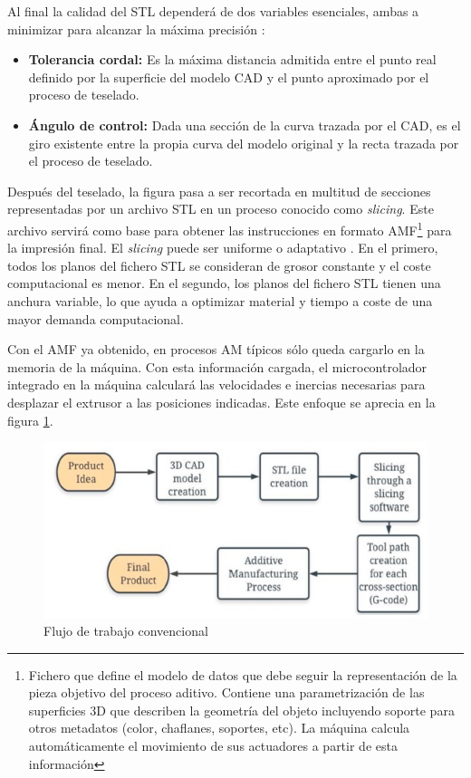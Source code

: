 Al final la calidad del \acrshort{STL} dependerá de dos variables esenciales, ambas a minimizar para alcanzar la máxima precisión \cite{Pinar2019}:
\begin{itemize}
    \item \textbf{Tolerancia cordal:} Es la máxima distancia admitida entre el punto real definido por la superficie del modelo CAD y el punto aproximado por el proceso de teselado.
    \item  \textbf{Ángulo de control:} Dada una sección de la curva trazada por el CAD, es el giro existente entre la propia curva del modelo original y la recta trazada por el proceso de teselado.
\end{itemize}

Después del teselado, la figura pasa a ser recortada en multitud de secciones representadas por un archivo \acrshort{STL} en un proceso conocido como \textit{slicing}. Este archivo servirá como base para obtener las instrucciones en formato \acrshort{AMF}\footnote{Fichero que define el modelo de datos que debe seguir la representación de la pieza objetivo del proceso aditivo. Contiene una parametrización de las superficies 3D que describen la geometría del objeto incluyendo soporte para otros metadatos (color, chaflanes, soportes, etc). La máquina calcula automáticamente el movimiento de sus actuadores a partir de esta información} para la impresión final. El \textit{slicing} puede ser uniforme o adaptativo \cite{Pinar2019}. En el primero, todos los planos del fichero \acrshort{STL} se consideran de grosor constante y el coste computacional es menor. En el segundo, los planos del fichero \acrshort{STL} tienen una anchura variable, lo que ayuda a optimizar material y tiempo a coste de una mayor demanda computacional. 

Con el \acrshort{AMF} ya obtenido, en procesos \acrshort{AM} típicos sólo queda cargarlo en la memoria de la máquina. Con esta información cargada, el microcontrolador integrado en la máquina calculará las velocidades e inercias necesarias para desplazar el extrusor a las posiciones indicadas. Este enfoque se aprecia en la figura \ref{fig:flujo_trabajo_normal}. 

\begin{figure}[h!]
    \centering
    \includegraphics[scale=0.5]{figuras/flujo_trabajo_normal.jpg}
    \caption{Flujo de trabajo convencional \cite{Pinar2019}}
    \label{fig:flujo_trabajo_normal}
\end{figure}

